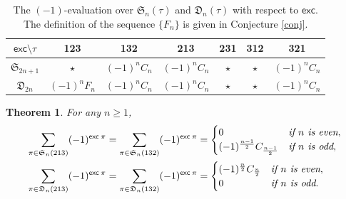 \documentclass[12pt,reqno]{amsart}
\numberwithin{equation}{section}
\theoremstyle{plain}
\newtheorem{theorem}{Theorem}[section]
\theoremstyle{definition}
\def\S{\mathfrak{S}}
\def\D{\mathfrak{D}}
\def\exc{\mathsf{exc}}
\begin{document}
\begin{table}[tbp]\caption{The $(-1)$-evaluation over $\S_n(\tau)$ and $\D_n(\tau)$ with respect to $\exc$. The definition of the sequence $\{F_n\}$ is given in Conjecture \ref{conj}.}
\label{tab:exc-avoid3}
\centering
\begin{tabular}{ccccccc}
\hline
$\exc\setminus \tau$ &123 &132 &213 &231 &312 &321\\
\hline
$\S_{2n+1}$ &$\star$ &$(-1)^nC_n$ &$(-1)^nC_n$ &$\star$ &$\star$ &$(-1)^nC_n$ \\
$\D_{2n}$ &$(-1)^nF_n$ &$(-1)^nC_n$ &$(-1)^nC_n$ &$\star$ &$\star$ &$(-1)^nC_n$ \\
\hline
\end{tabular}
\end{table}

\begin{theorem}\label{nara-others}
For any $n\ge 1$,
\begin{align}
\label{132-odd}
\sum_{\pi\in\S_n(213)}(-1)^{\exc\:\pi}=\sum_{\pi\in\S_n(132)}(-1)^{\exc\:\pi}&=\begin{cases}0 & \emph{if $n$ is even},\\
(-1)^{\frac{n-1}{2}}C_{\frac{n-1}{2}} & \emph{if $n$ is odd},
\end{cases}\\
\label{132-even}
\sum_{\pi\in\D_n(213)}(-1)^{\exc\:\pi}=\sum_{\pi\in\D_n(132)}(-1)^{\exc\:\pi}&=\begin{cases}(-1)^{\frac{n}{2}}C_{\frac{n}{2}} & \emph{if $n$ is even},\\
0 & \emph{if $n$ is odd}.
\end{cases}
\end{align}
\end{theorem}
\end{document}
